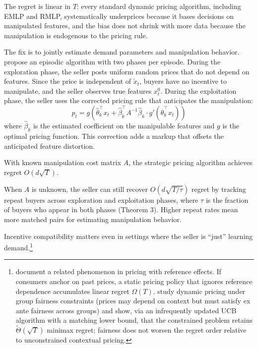 The regret is linear in $T$: every standard dynamic pricing algorithm, including EMLP and RMLP, systematically underprices because it bases decisions on manipulated features, and the bias does not shrink with more data because the manipulation is endogenous to the pricing rule.

The fix is to jointly estimate demand parameters and manipulation behavior. \citet{Liu2024strategic} propose an episodic algorithm with two phases per episode. During the exploration phase, the seller posts uniform random prices that do not depend on features. Since the price is independent of $\tilde{x}_t$, buyers have no incentive to manipulate, and the seller observes true features $x_t^0$. During the exploitation phase, the seller uses the corrected pricing rule that anticipates the manipulation:
\begin{equation}
\label{eq:strategic_price}
p_t = g\left(\hat{\theta}_k^\top x_t + \hat{\beta}_k^\top A^{-1} \hat{\beta}_k \cdot g'(\hat{\theta}_k^\top x_t)\right)
\end{equation}
where $\hat{\beta}_k$ is the estimated coefficient on the manipulable features and $g$ is the optimal pricing function. This correction adds a markup that offsets the anticipated feature distortion.

\begin{theorem}
\label{thm:liu_fix}
With known manipulation cost matrix $A$, the strategic pricing algorithm achieves regret $O(d\sqrt{T})$.
\end{theorem}

When $A$ is unknown, the seller can still recover $O(d\sqrt{T/\tau})$ regret by tracking repeat buyers across exploration and exploitation phases, where $\tau$ is the fraction of buyers who appear in both phases (Theorem 3). Higher repeat rates mean more matched pairs for estimating manipulation behavior.

Incentive compatibility matters even in settings where the seller is ``just'' learning demand.\footnote{\citet{Agrawal2024ref} document a related phenomenon in pricing with reference effects. If consumers anchor on past prices, a static pricing policy that ignores reference dependence accumulates linear regret $\Omega(T)$. \citet{Cohen2025fairness} study dynamic pricing under group fairness constraints (prices may depend on context but must satisfy ex ante fairness across groups) and show, via an infrequently updated UCB algorithm with a matching lower bound, that the constrained problem retains $\tilde{\Theta}(\sqrt{T})$ minimax regret; fairness does not worsen the regret order relative to unconstrained contextual pricing.}

